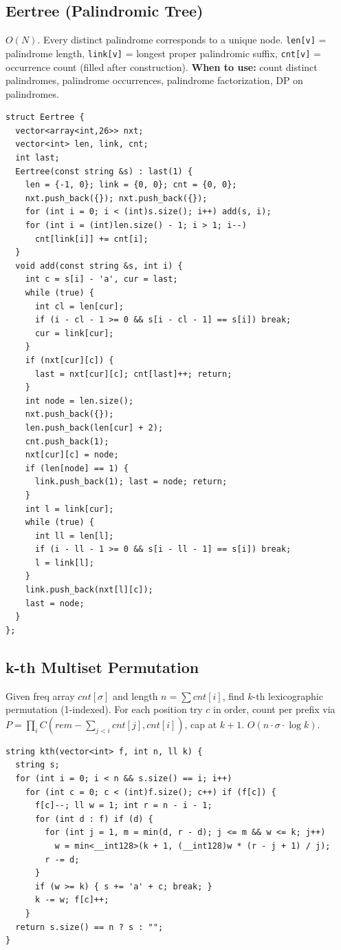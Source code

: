 \subsection{Eertree (Palindromic Tree)}
$O(N)$. Every distinct palindrome corresponds to a unique node. \texttt{len[v]} = palindrome length,
\texttt{link[v]} = longest proper palindromic suffix, \texttt{cnt[v]} = occurrence count (filled after construction).
\textbf{When to use:} count distinct palindromes, palindrome occurrences, palindrome factorization, DP on palindromes.
\begin{verbatim}
struct Eertree {
  vector<array<int,26>> nxt;
  vector<int> len, link, cnt;
  int last;
  Eertree(const string &s) : last(1) {
    len = {-1, 0}; link = {0, 0}; cnt = {0, 0};
    nxt.push_back({}); nxt.push_back({});
    for (int i = 0; i < (int)s.size(); i++) add(s, i);
    for (int i = (int)len.size() - 1; i > 1; i--)
      cnt[link[i]] += cnt[i];
  }
  void add(const string &s, int i) {
    int c = s[i] - 'a', cur = last;
    while (true) {
      int cl = len[cur];
      if (i - cl - 1 >= 0 && s[i - cl - 1] == s[i]) break;
      cur = link[cur];
    }
    if (nxt[cur][c]) {
      last = nxt[cur][c]; cnt[last]++; return;
    }
    int node = len.size();
    nxt.push_back({});
    len.push_back(len[cur] + 2);
    cnt.push_back(1);
    nxt[cur][c] = node;
    if (len[node] == 1) {
      link.push_back(1); last = node; return;
    }
    int l = link[cur];
    while (true) {
      int ll = len[l];
      if (i - ll - 1 >= 0 && s[i - ll - 1] == s[i]) break;
      l = link[l];
    }
    link.push_back(nxt[l][c]);
    last = node;
  }
};
\end{verbatim}
\subsection{k-th Multiset Permutation}
Given freq array $cnt[\sigma]$ and length $n = \sum cnt[i]$, find $k$-th lexicographic permutation (1-indexed). For each position try $c$ in order, count per prefix via $P = \prod_i C(rem - \sum_{j<i} cnt[j], cnt[i])$, cap at $k+1$. $O(n \cdot \sigma \cdot \log k)$.
\begin{verbatim}
string kth(vector<int> f, int n, ll k) {
  string s;
  for (int i = 0; i < n && s.size() == i; i++)
    for (int c = 0; c < (int)f.size(); c++) if (f[c]) {
      f[c]--; ll w = 1; int r = n - i - 1;
      for (int d : f) if (d) {
        for (int j = 1, m = min(d, r - d); j <= m && w <= k; j++)
          w = min<__int128>(k + 1, (__int128)w * (r - j + 1) / j);
        r -= d;
      }
      if (w >= k) { s += 'a' + c; break; }
      k -= w; f[c]++;
    }
  return s.size() == n ? s : "";
}
\end{verbatim}
